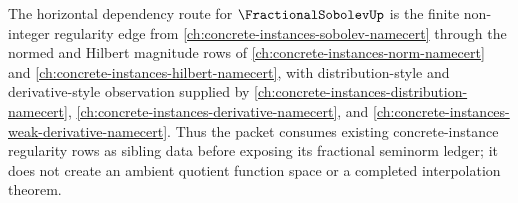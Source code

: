 The horizontal dependency route for $\FractionalSobolevUp$ is the finite non-integer regularity edge from \autoref{ch:concrete-instances-sobolev-namecert} through the normed and Hilbert magnitude rows of \autoref{ch:concrete-instances-norm-namecert} and \autoref{ch:concrete-instances-hilbert-namecert}, with distribution-style and derivative-style observation supplied by \autoref{ch:concrete-instances-distribution-namecert}, \autoref{ch:concrete-instances-derivative-namecert}, and \autoref{ch:concrete-instances-weak-derivative-namecert}. Thus the packet consumes existing concrete-instance regularity rows as sibling data before exposing its fractional seminorm ledger; it does not create an ambient quotient function space or a completed interpolation theorem.
